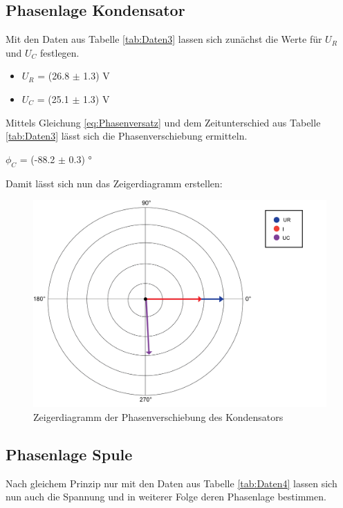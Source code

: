 \documentclass[12pt,a4paper,twoside]{article}
\begin{document}
\subsection{Phasenlage Kondensator}

Mit den Daten aus Tabelle \ref{tab:Daten3} lassen sich zunächst die Werte für $U_R$ und $U_C$ festlegen. \newline

\noindent
\begin{itemize}
    \item $U_R$ = (26.8 $\pm$ 1.3) V
    \item $U_C$ = (25.1 $\pm$ 1.3) V
\end{itemize}

\noindent
Mittels Gleichung \ref{eq:Phasenversatz} und dem Zeitunterschied aus Tabelle \ref{tab:Daten3} lässt sich die Phasenverschiebung ermitteln. \newline

\noindent
$\phi_C$ = (-88.2 $\pm$ 0.3) ° \newline

\noindent
Damit lässt sich nun das Zeigerdiagramm erstellen:

\begin{figure}[H]
    \centering
    \includegraphics[width=0.6\linewidth]{nudes/Phasendiagramm3.png}
    \caption{Zeigerdiagramm der Phasenverschiebung des Kondensators}
    \label{fig:ZeigerdiagrammPhiC}
\end{figure}



\subsection{Phasenlage Spule}

Nach gleichem Prinzip nur mit den Daten aus Tabelle \ref{tab:Daten4} lassen sich nun auch die Spannung und in weiterer Folge deren Phasenlage bestimmen. \newline
\end{document}
